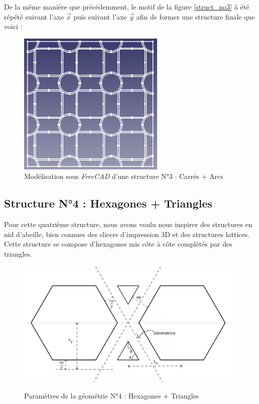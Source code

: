 \documentclass[a4paper]{article}
\begin{document}
	De la même manière que précédemment, le motif de la figure \ref{struct_no3} à été répété suivant l’axe $\vec{x}$ puis suivant l’axe $\vec{y}$ afin de former une structure finale que voici :
	
	\begin{figure}[H]
		\centering
		\includegraphics[width=7cm]{Images/5/Freecad_carres.png}
		\caption{Modélisation sous \textit{FreeCAD} d’une structure N°3 : Carrés + Arcs}
	\end{figure}
	\newpage
	
	\subsection{Structure N°4 : Hexagones + Triangles}
	\hspace{0.5cm}Pour cette quatrième structure, nous avons voulu nous inspirer des structures en nid d’abeille, bien connues des slicers d’impression 3D et des structures lattices. Cette structure se compose d’hexagones mis côte à côte complétés par des triangles.\\
	
	\begin{figure}[H]
		\centering
		\includegraphics[width=11cm]{Images/5/hexagone.pdf}\\
		\caption{Paramètres de la géométrie N°4 : Hexagones + Triangles}
	\end{figure}
	
\end{document}
